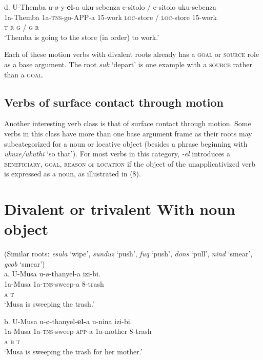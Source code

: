 \documentclass[output=paper]{langsci/langscibook}
\begin{document}
\gll   d.  U-Themba  u-ø-y-\textbf{el-}a      uku-sebenza  e-sitolo    / e-sitolo    uku-sebenza \\
         1a-Themba  1a-\textsc{tns}{}-go-APP-a    15-work    \textsc{loc}{}-store  / \textsc{loc}{}-store  15-work\\
         \textsc{t                r      g      / g      r}\\
\glt     ‘Themba is going to the store (in order) to work.’
\z

Each of these motion verbs with divalent roots already has a \textsc{goal} or \textsc{source} role as a base argument. The root \textit{suk} ‘depart’ is one example with a \textsc{source} rather than a \textsc{goal}.

\section{Verbs of surface contact through motion}

Another interesting verb class is that of surface contact through motion. Some verbs in this class have more than one base argument frame as their roots may subcategorized for a noun or locative object (besides a phrase beginning with \textit{ukuze/ukuthi} ‘so that’). For most verbs in this category, \textit{{}-el} introduces a \textsc{beneficiary}, \textsc{goal}, \textsc{reason} or \textsc{location} if the object of the unapplicativized verb is expressed as a noun, as illustrated in (8). 

\chapter{Divalent or trivalent With noun object}
     (Similar roots: \textit{esula} ‘wipe’, \textit{sunduz} ‘push’, \textit{fuq} ‘push’, \textit{dons} ‘pull’, \textit{nind} ‘smear’, \textit{gcob} ‘smear’)\\
\gll   a.  U-Musa    u-ø-thanyel-a       izi-bi. \\
         1a-Musa     1a-\textsc{tns}{}-sweep-a   8-trash\\
         \textsc{a                  t}\\
\glt     ‘Musa is sweeping the trash.’
\z

\gll   b.  U-Musa    u-ø-thanyel-\textbf{el-}a         u-nina         izi-bi. \\
         1a-Musa     1a-\textsc{tns}{}-sweep-\textsc{app}{}-a  1a-mother   8-trash\\
         \textsc{a                  b        t}\\
\glt     ‘Musa is sweeping the trash for her mother.’
\z
\end{document}
